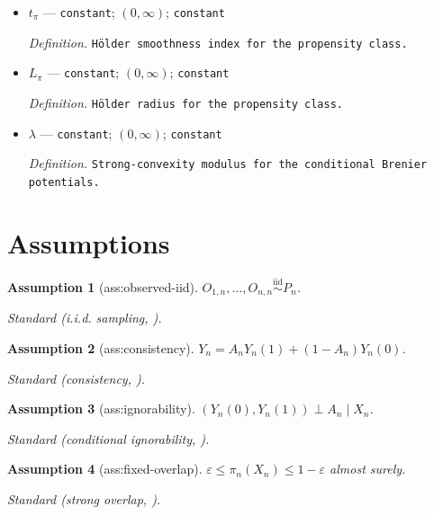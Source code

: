 \documentclass{article}
\newtheorem{assumption}{Assumption}
\begin{document}
\begin{itemize}
  \par\smallskip\noindent\emph{Definition.} \texttt{Standard-\allowbreak{}normal distribution function.}
  \item \(t_\pi\) --- \texttt{constant}; \((0,\infty)\); \texttt{constant}
  \par\smallskip\noindent\emph{Definition.} \texttt{Hölder smoothness index for the propensity class.}
  \item \(L_\pi\) --- \texttt{constant}; \((0,\infty)\); \texttt{constant}
  \par\smallskip\noindent\emph{Definition.} \texttt{Hölder radius for the propensity class.}
  \item \(\lambda\) --- \texttt{constant}; \((0,\infty)\); \texttt{constant}
  \par\smallskip\noindent\emph{Definition.} \texttt{Strong-\allowbreak{}convexity modulus for the conditional Brenier potentials.}
\end{itemize}

\section{Assumptions}

\begin{assumption}[ass:observed-iid]\label{ass:observed-iid}
\(O_{1,n},\ldots,O_{n,n}\stackrel{\mathrm{iid}}{\sim}P_n\).
\par\smallskip\noindent\emph{Standard} (i.i.d. sampling, \cite{chernozhukov2018double}).
\end{assumption}

\begin{assumption}[ass:consistency]\label{ass:consistency}
\(Y_n=A_nY_n(1)+(1-A_n)Y_n(0)\).
\par\smallskip\noindent\emph{Standard} (consistency, \cite{imbens2015causal}).
\end{assumption}

\begin{assumption}[ass:ignorability]\label{ass:ignorability}
\((Y_n(0),Y_n(1))\perp A_n\mid X_n\).
\par\smallskip\noindent\emph{Standard} (conditional ignorability, \cite{imbens2015causal}).
\end{assumption}

\begin{assumption}[ass:fixed-overlap]\label{ass:fixed-overlap}
\(\varepsilon\le\pi_n(X_n)\le1-\varepsilon\) almost surely.
\par\smallskip\noindent\emph{Standard} (strong overlap, \cite{crump2009dealing}).
\end{assumption}
\end{document}
